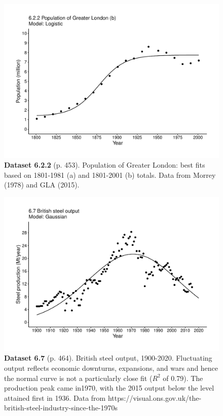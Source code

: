 \documentclass[aps,rmp,preprint,superscriptaddress,10pt,onecolumn]{article}
\begin{document}
\clearpage
\begin{figure}[h]
\includegraphics[width=\textwidth]{output/figs-ggplot/6.2.2.pdf}
\caption*{\textbf{Dataset 6.2.2} (p. 453). Population of Greater London: best fits based on 1801-1981 (a) and 1801-2001 (b) totals. Data from Morrey (1978) and GLA (2015). }
\end{figure}
	
\clearpage
\begin{figure}[h]
\includegraphics[width=\textwidth]{output/figs-ggplot/6.7.pdf}
\caption*{\textbf{Dataset 6.7} (p. 464). British steel output, 1900-2020. Fluctuating output reflects economic downturns, expansions, and wars and hence the normal curve is not a particularly close fit ($R^2$ of 0.79). The production peak came in1970, with the 2015 output below the level attained first in 1936. Data from https://visual.ons.gov.uk/the-british-steel-industry-since-the-1970s}
\end{figure}
	
\end{document}
